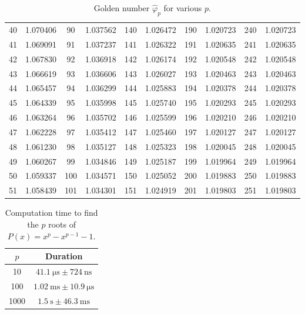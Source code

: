 \documentclass{article}
\begin{document}
\begin{table}
\begin{tabular}{*{10}{c}}
        40 & 1.070406 & 90 & 1.037562 & 140 & 1.026472 & 190 & 1.020723 & 240 & 1.020723 \\
        41 & 1.069091 & 91 & 1.037237 & 141 & 1.026322 & 191 & 1.020635 & 241 & 1.020635 \\
        42 & 1.067830 & 92 & 1.036918 & 142 & 1.026174 & 192 & 1.020548 & 242 & 1.020548 \\
        43 & 1.066619 & 93 & 1.036606 & 143 & 1.026027 & 193 & 1.020463 & 243 & 1.020463 \\
        44 & 1.065457 & 94 & 1.036299 & 144 & 1.025883 & 194 & 1.020378 & 244 & 1.020378 \\
        45 & 1.064339 & 95 & 1.035998 & 145 & 1.025740 & 195 & 1.020293 & 245 & 1.020293 \\
        46 & 1.063264 & 96 & 1.035702 & 146 & 1.025599 & 196 & 1.020210 & 246 & 1.020210 \\
        47 & 1.062228 & 97 & 1.035412 & 147 & 1.025460 & 197 & 1.020127 & 247 & 1.020127 \\
        48 & 1.061230 & 98 & 1.035127 & 148 & 1.025323 & 198 & 1.020045 & 248 & 1.020045 \\
        49 & 1.060267 & 99 & 1.034846 & 149 & 1.025187 & 199 & 1.019964 & 249 & 1.019964 \\
        50 & 1.059337 & 100 & 1.034571 & 150 & 1.025052 & 200 & 1.019883 & 250 & 1.019883 \\
        51 & 1.058439 & 101 & 1.034301 & 151 & 1.024919 & 201 & 1.019803 & 251 & 1.019803 \\
        \bottomrule
      \end{tabular}
      \caption{Golden number $\hat{\varphi}_p$ for various $p$.}
    \end{table}

    \begin{table}
      \centering
      \begin{tabular}{cc}
        \toprule
        $p$ & Duration \\
        \midrule
        10 & $\SI{41.1}{\micro\second} \pm \SI{724}{\nano\second}$\\
        100 & $\SI{1.02}{\milli\second} \pm \SI{10.9}{\micro\second}$\\
        1000 & $\SI{1.5}{\second} \pm \SI{46.3}{\milli\second}$\\
        \bottomrule
      \end{tabular}
      \caption{Computation time to find the $p$ roots of $P(x) = x^p - x^{p-1} - 1$.}
    \end{table}
\end{document}
